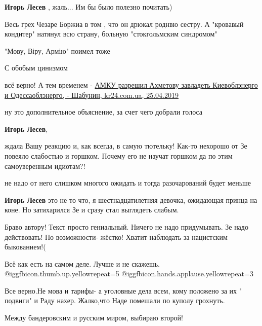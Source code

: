 \begin{itemize}
\begin{itemize}
\textbf{Игорь Лесев} , жаль... Им бы было полезно почитать)
\end{itemize} %


Весь грех Чезаре Боржиа в том , что он дрюкал роднвю сестру. А "кровавый
кондитер" натянул всю страну, больную "стокгольмским синдромом"

"Мову, Віру, Армію" поимел тоже

С обобым цинизмом


всё верно! А тем временем -
\href{https://kr24.com.ua}{%
АМКУ разрешил Ахметову завладеть Киевоблэнерго и Одессаоблэнерго, - Шабунин, %
kr24.com.ua, 25.04.2019%
}

\begin{itemize} %
ну это дополнительное объяснение, за счет чего добрали голоса
\end{itemize} %

\textbf{Игорь Лесев}, 

ждала Вашу реакцию и, как всегда, в самую тютельку! Как-то нехорошо от Зе
повеяло слабостью и горшком. Почему его не научат горшком да по этим
самоуверенным идиотам?!

\begin{itemize} %
не надо от него слишком многого ожидать и тогда разочарований будет меньше

\textbf{Игорь Лесев} это не то что, я шестнадцатилетняя девочка, ожидающая принца на коне. Но затихарился Зе и сразу стал выглядеть слабым.
\end{itemize} %


Браво автору! Текст просто гениальный. Ничего не надо придумывать. Зе надо
действовать! По возможности- жёстко! Хватит наблюдать за нацистским
быкованием!(

Всё как есть на самом деле. Лучше и не скажешь.  @igg{fbicon.thumb.up.yellow}{repeat=5}  @igg{fbicon.hands.applause.yellow}{repeat=3} 


Все верно.Не мова и тарифы- а уголовные дела всем, кому положено за их " подвиги" и Раду нахер.
Жалко,что Наде помешали по куполу грохнуть.

Между бандеровским и русским миром, выбираю второй!


\end{itemize}
